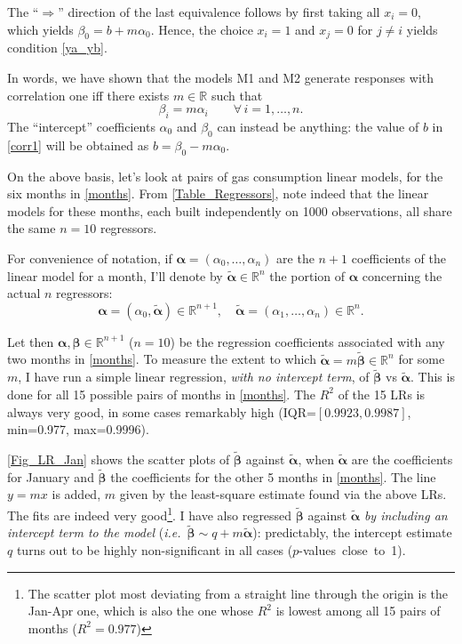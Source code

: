 \documentclass[a4paper, 12pt]{article}
\newcommand{\ie}{\textit{i.e.}}
\newcommand{\R}{\mathbb{R}}
\newcommand{\bd}[1]{\boldsymbol{#1}}
\newcommand{\ya}{y^{(\alpha)}}
\newcommand{\yb}{y^{(\beta)}}
\newcommand{\ta}{\bd{\widetilde \alpha}}
\newcommand{\tb}{\bd{\widetilde \beta}}
\begin{document}
The ``$\Rightarrow$'' direction of the last equivalence follows by first taking all $x_i=0$, which yields $\beta_0 = b + m\alpha_0$. Hence, the choice $x_i=1$ and $x_j=0$ for $j\neq i$ yields condition \eqref{ya_yb}.

In words, we have shown that the models M1 and M2 generate responses with correlation one iff there exists $m\in \R$ such that
\begin{equation}
\beta_i=m\alpha_i \qquad \forall\, i=1, \dots,n.
\end{equation}
The ``intercept'' coefficients $\alpha_0$ and $\beta_0$ can instead be anything: the value of $b$ in \eqref{corr1} will be obtained as $b=\beta_0 - m\alpha_0$. 

On the above basis, let's look at pairs of gas consumption linear models, for the six months in \eqref{months}. From \autoref{Table_Regressors}, note indeed that the linear models for these months, each built independently on 1000 observations, all share the same $n=10$ regressors. 

For convenience of notation, if $\bd \alpha=(\alpha_0, \dots, \alpha_n)$ are the $n+1$ coefficients of the linear model for a month, I'll denote by $\ta \in \R^n$ the portion of $\bd \alpha$ concerning the actual $n$ regressors:
$$
\bd \alpha = (\alpha_0, \ta) \in \R^{n+1}, \quad
\ta=(\alpha_1, \dots, \alpha_n) \in \R^n.
$$

Let then $\bd\alpha, \bd\beta \in \R^{n+1}$ ($n=10$) be the regression coefficients associated with any two months in \eqref{months}. To measure the extent to which $\ta = m \tb \in \R^n$ for some $m$, I have run a simple linear regression, \emph{with no intercept term}, of $\tb$ vs $\ta$. This is done for all 15 possible pairs of months in \eqref{months}. 
The $R^2$ of the 15 LRs is always very good, in some cases remarkably high (IQR=$[0.9923, 0.9987]$, min=0.977, max=0.9996).

\autoref{Fig_LR_Jan} shows the scatter plots of $\tb$ against $\ta$, when $\ta$ are the coefficients for January and $\tb$ the coefficients for the other 5 months in \eqref{months}. The line $y = mx$ is added, $m$ given by the least-square estimate found via the above LRs. The fits are indeed very good\footnote{The scatter plot most deviating from a straight line through the origin is the Jan-Apr one, which is also the one whose $R^2$ is lowest among all 15 pairs of months  ($R^2=0.977$)}.
I have also regressed $\tb$ against $\ta$ \emph{by including an intercept term to the model} (\ie~$\tb\sim q + m \ta$): predictably, the intercept estimate $q$ turns out to be highly non-significant in all cases \mbox{($p$-values close to 1).}
\end{document}
